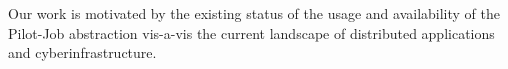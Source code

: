 \documentclass[conference,final]{IEEEtran}
\newcommand{\jhanote}[1]{ {\textcolor{red} { ***shantenu: #1 }}}
\newcommand{\jhanote}[1]{}
\begin{document}
Our work is motivated by the existing status of the usage and
availability of the Pilot-Job abstraction vis-a-vis the current
landscape of distributed applications and cyberinfrastructure.









      

\end{document}
